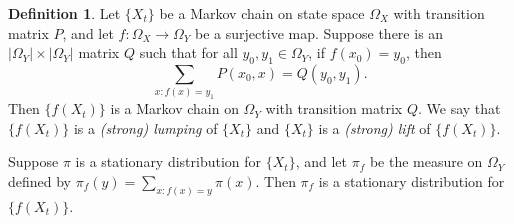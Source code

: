 \documentclass[11pt]{amsart}
\theoremstyle{definition}
\newtheorem{definition}[theorem]{Definition}
\theoremstyle{remark}
\begin{document}

	\begin{definition}
Let $\{X_t\}$ be a Markov chain on state space $\Omega_X$ with transition matrix $P$,
and let $f:\Omega_X \to \Omega_Y$ be a surjective map.  
Suppose there is an $|\Omega_Y| \times |\Omega_Y|$ matrix $Q$ such that 
	for all $y_0, y_1\in \Omega_Y$, if $f(x_0)=y_0$, then 
	\begin{equation} \label{eq:lumping}
	\sum_{x: f(x)=y_1} P(x_0,x) = Q(y_0, y_1).
	\end{equation}
Then $\{f(X_t)\}$  is a Markov chain on 
$\Omega_Y$ with transition matrix $Q$.
We say that $\{f(X_t)\}$ is a 
	\emph{(strong) lumping} 
	of $\{X_t\}$ and 
$\{X_t\}$ is a 
	\emph{(strong) lift} of $\{f(X_t)\}$.

Suppose	$\pi$ is a stationary distribution
for $\{X_t\}$, and 
	let $\pi_f$ be the measure on $\Omega_Y$ defined by 
	$\pi_f(y) = \sum_{x: f(x)=y} \pi(x)$. Then $\pi_f$
	is a stationary distribution for $\{f(X_t)\}$.
	\end{definition}
\end{document}
